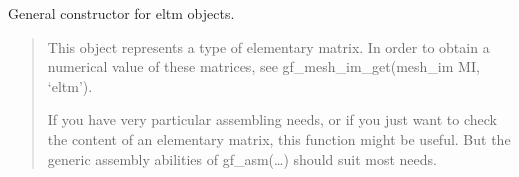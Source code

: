 \documentclass[a4paper,11pt,english]{sphinxmanual}
\begin{document}
\begin{sphinxVerbatim}[commandchars=\\\{\}]
    
    
    
  
  
  
      
\end{sphinxVerbatim}

\sphinxAtStartPar
{}

\sphinxAtStartPar
General constructor for eltm objects.
\begin{quote}

\sphinxAtStartPar
This object represents a type of elementary matrix. In order to obtain a
numerical value of these matrices, see gf\_mesh\_im\_get(mesh\_im MI, ‘eltm’).

\sphinxAtStartPar
If you have very particular assembling needs, or if you just want to check
the content of an elementary matrix, this function might be useful. But
the generic assembly abilities of gf\_asm(…) should suit most needs.
\end{quote}
\end{document}
